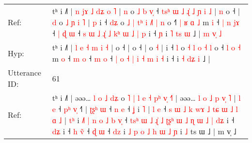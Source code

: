 \documentclass[10pt]{article}
\DeclareRobustCommand{\hl}[1]{{\textcolor{red}{#1}}}
\begin{document}
\begin{longtable}{ll}
Ref: & tʰ i ˩˥ | \hl{n} \hl{j}\hl{ɤ} \hl{˩} \hl{d}\hl{ʑ} \hl{o} \hl{˥} |\hl{ }\hl{n} o\hl{ }\hl{˩}\hl{ }\hl{b}\hl{ }\hl{v}\hl{̩} ˧\hl{ }\hl{t}\hl{s}\hl{ʰ}\hl{ }\hl{ɯ}\hl{ }\hl{˩}\hl{ }\hl{ɻ}\hl{̍}\hl{ }\hl{˩}\hl{ }\hl{ɲ}\hl{ }\hl{i}\hl{ }\hl{˩} |\hl{ }\hl{n} o ˧ |\hl{ }\hl{d} o\hl{ }\hl{˩}\hl{ }\hl{ɲ}\hl{ }\hl{i} \hl{˥} |\hl{ }\hl{p} i ˧ \hl{d}\hl{ʑ} o\hl{ }\hl{˩}\hl{ }\hl{|} \hl{t}\hl{ʰ} \hl{i} \hl{˩}\hl{˥} \hl{|} \hl{n} o ˧\hl{˥}\hl{ }\hl{|} \hl{ʁ} \hl{ɑ} \hl{˩} m \hl{i} ˧\hl{ }\hl{|} \hl{n} \hl{j}\hl{ɤ} ˧\hl{ }\hl{|} \hl{ɖ} \hl{ɯ} ˧\hl{ }\hl{s} \hl{ɯ} \hl{˩} \hl{ɻ}\hl{̍} \hl{˩} \hl{k}\hl{ʰ} \hl{ɯ} \hl{˩} \hl{|} \hl{p} i ˧\hl{ }\hl{ɲ} i \hl{˥} \hl{t}\hl{s} \hl{ɯ} ˩ |\hl{ }\hl{m}\hl{ }\hl{v}\hl{̩}\hl{ }\hl{˩}
 \\
Hyp: & tʰ i ˩˥ | \hl{l} \hl{}\hl{e} \hl{˧} \hl{}\hl{m} \hl{i} \hl{˧} |\hl{}\hl{} o\hl{}\hl{}\hl{}\hl{}\hl{}\hl{}\hl{} ˧\hl{}\hl{}\hl{}\hl{}\hl{}\hl{}\hl{}\hl{}\hl{}\hl{}\hl{}\hl{}\hl{}\hl{}\hl{}\hl{}\hl{}\hl{}\hl{} |\hl{}\hl{} o ˧ |\hl{}\hl{} o\hl{}\hl{}\hl{}\hl{}\hl{}\hl{} \hl{˧} |\hl{}\hl{} i ˧ \hl{}\hl{l} o\hl{}\hl{}\hl{}\hl{} \hl{}\hl{˧} \hl{l} \hl{}\hl{o} \hl{˧} \hl{l} o ˧\hl{}\hl{}\hl{} \hl{l} \hl{o} \hl{˧} m \hl{o} ˧\hl{}\hl{} \hl{m} \hl{}\hl{o} ˧\hl{}\hl{} \hl{m} \hl{o} ˧\hl{}\hl{} \hl{|} \hl{o} \hl{}\hl{˧} \hl{|} \hl{}\hl{i} \hl{˧} \hl{m} \hl{i} \hl{˧} i ˧\hl{}\hl{} i \hl{˧} \hl{d}\hl{ʑ} \hl{i} ˩ |\hl{}\hl{}\hl{}\hl{}\hl{}\hl{}\hl{}
 \\
\midrule
Utterance ID: & 61 \\
Ref: & tʰ i ˩˥ | əəə…\hl{ }\hl{l}\hl{ }\hl{o}\hl{ }\hl{˩}\hl{ }\hl{d}\hl{ʑ} o\hl{ }\hl{˥}\hl{ }\hl{|}\hl{ }\hl{l}\hl{ }\hl{e}\hl{ }\hl{˧}\hl{ }\hl{p}\hl{ʰ} \hl{v}\hl{̩}\hl{ }\hl{˧}\hl{˥} | əəə…\hl{ }\hl{l}\hl{ }\hl{o}\hl{ }\hl{˩}\hl{ }\hl{p}\hl{ }\hl{v}\hl{̩} \hl{˥} |\hl{ }\hl{l} \hl{e} ˧ \hl{p}\hl{ʰ} \hl{v}\hl{̩} ˧\hl{˥} |\hl{ }\hl{ʈ}\hl{ʂ}\hl{ʰ} \hl{ɯ} ˧ \hl{n} \hl{e} ˧ \hl{ʝ} i \hl{˥} |\hl{ }\hl{l} \hl{e} ˧\hl{ }\hl{s}\hl{ }\hl{ɯ}\hl{ }\hl{˩}\hl{ }\hl{k}\hl{ }\hl{w}\hl{ɤ}\hl{ }\hl{˩}\hl{ }\hl{t}\hl{ɕ}\hl{ }\hl{ɯ}\hl{ }\hl{˩}\hl{ }\hl{l}\hl{ }\hl{ɑ}\hl{ }\hl{˩} |\hl{ }\hl{t}\hl{ʰ} i\hl{ }\hl{˩}\hl{˥} \hl{|} \hl{n} \hl{o} \hl{˩} \hl{b} \hl{v}\hl{̩} ˧ \hl{t}\hl{s}\hl{ʰ} \hl{ɯ} \hl{˩} \hl{ɻ}\hl{̍} \hl{˩} \hl{ʈ}\hl{ʂ}\hl{ʰ} \hl{ɯ} \hl{˩} \hl{ɳ} \hl{ɯ} \hl{˩} \hl{|} \hl{d}\hl{ʑ} i ˧ \hl{d}\hl{ʑ} i ˧ \hl{h} \hl{v}\hl{̃} ˧ \hl{ɖ} \hl{ɯ} ˧ \hl{d}\hl{z} i \hl{˩} \hl{p} \hl{o} \hl{˩} \hl{h} \hl{ɯ} \hl{˩} \hl{ɲ} i \hl{˩} ts ɯ ˩ | m v̩ ˩
 \\

\end{longtable}
\end{document}
